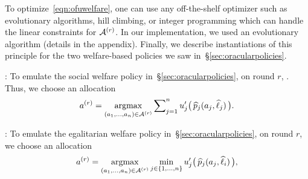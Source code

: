 To optimize~\eqref{eqn:ofuwelfare}, one can use any off-the-shelf optimizer such as
evolutionary algorithms, hill climbing, or integer programming which can handle the linear
constraints for $\mathcal{A}^{(r)}$.
In our implementation, we used an evolutionary algorithm (details in the appendix).
Finally,  we describe instantiations of this principle for the two welfare-based policies
we saw in~\S\ref{sec:oracularpolicies}.


:
To emulate the social welfare policy in~\S\ref{sec:oracularpolicies},
on round $r$, . Thus, we choose an allocation
\begin{align*}
a^{(r)}
       = \mathop{\mathrm{argmax}}_{(a_1,\dots,a_n)\in\mathcal{A}^{(r)}} \sum\nolimits_{j=1}^n u'_{j}\big(\,\widehat{p}_{j}(a_{j}, \widehat{\ell}_{j})\,\big).
\end{align*}


:
To emulate the egalitarian welfare policy in~\S\ref{sec:oracularpolicies},
on round $r$, we choose an allocation
\begin{align*}
a^{(r)}
       = \mathop{\mathrm{argmax}}_{(a_1,\dots,a_n)\in\mathcal{A}^{(r)}} \min_{j\in\{1,\dots,n\}} u'_{j}\big(\,\widehat{p}_{j}(a_{j}, \widehat{\ell}_{i})\,\big),
\end{align*}


